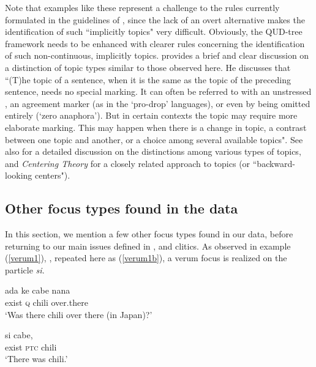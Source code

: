 \documentclass[output=paper
,modfonts
,nonflat]{langsci/langscibook}
\begin{document}
\noindent Note that examples like these represent a challenge to the rules currently formulated in the guidelines of \citet{riear17b}, since the lack of an overt alternative makes the identification of such ``implicitly  topics" very difficult. Obviously, the QUD-tree framework  needs to be enhanced with clearer rules concerning the identification of such non-continuous, implicitly  topics. \cite[][136]{kropa04} provides a brief and clear discussion on a distinction of topic types similar to those observed here. He discusses that ``(T)he topic of a sentence, when it is the same as the topic of the preceding sentence, needs no special marking. It can often be referred to with an unstressed , an agreement marker (as in the `pro-drop' languages), or even by being omitted entirely (`zero anaphora').  But in certain contexts the topic may require more elaborate marking. This may happen when there is a change in topic, a contrast between one topic and another, or a choice among several available topics". See also \cite[][117ff.]{Lambrecht1994} for a detailed discussion on the distinctions among various types of topics, and \textit{Centering Theory} \citep{walma98} for a closely related  approach to topics (or ``backward-looking centers").


\subsection{Other focus types found in the data}

In this section, we mention a few other focus types found in our data, before returning to our main issues defined in ,  and clitics. As observed in example (\ref{verum1}), ,  repeated here as (\ref{verum1b}), a verum focus is realized on the particle \textit{si}. 

\begin{exe}
	\ex\label{verum1b}
	\begin{xlist}[Q\textsubscript{{7}}:]
		\gll ada ke cabe nana\\
		exist \textsc{q} chili over.there\\
		\glt `Was there chili over there (in Japan)?'
	\end{xlist}
	\begin{xlist}[> A\textsubscript{7}:]
			{{\ob}si{\cb}\focus} {{\ob}cabe,{\cb}\topic{\cb}\sq}\\
		\hphantom{[}exist \textsc{ptc} \hphantom{[}chili\\
		\glt `There was chili.'
	\end{xlist}
\end{exe}
\end{document}

